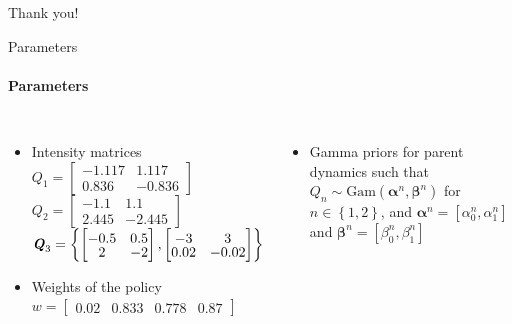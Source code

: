 \documentclass[
english,%
aspectratio=169,%
color={accentcolor=3b},
logo=true,%
colorframetitle=false,%
]{tudabeamer}
\begin{document}
\begin{frame}[c]{}
\centering \Huge
Thank you!
\end{frame}

%

\begin{frame}{Parameters}
\framesubtitle{Parameters}
\begin{columns}[T]
\begin{itemize}
\item Intensity matrices \vspace{+4pt}\\
$ Q_1 = 
\begin{bmatrix}
-1.117 & 1.117 \\
0.836 &  -0.836
\end{bmatrix} $\\
\vspace{+3pt}
$ Q_2 = 
\begin{bmatrix}
-1.1 & 1.1 \\
2.445 &  -2.445
\end{bmatrix}$\\
\vspace{+3pt}
$\textbf{\textit{Q}}_{3} = \left\lbrace 
\begin{bmatrix}\vspace{-2pt}
-0.5 & 0.5 \\\vspace{-2pt}
2 &  -2
\end{bmatrix}, 
\begin{bmatrix}\vspace{-2pt}
-3 & 3 \\\vspace{-2pt}
0.02 &  -0.02
\end{bmatrix} 
\right\rbrace $
\item Weights of the policy \vspace{+4pt} \\ $  w = \begin{bmatrix}0.02 & 0.833& 0.778& 0.87 \end{bmatrix}$
\end{itemize}
\begin{itemize}
\item Gamma priors for parent dynamics such that $ Q_{n} \sim \mathrm{Gam}(\boldsymbol{\alpha}^n, \boldsymbol{\beta}^n)$ for $n \in \left\lbrace 1,2\right\rbrace $, and $ \boldsymbol{\alpha}^n = [\alpha^n_0, \alpha^n_1] $ and $ \boldsymbol{\beta}^n = [\beta^n_0, \beta^n_1] $

\end{itemize}
\end{columns}
\end{frame}
\end{document}
